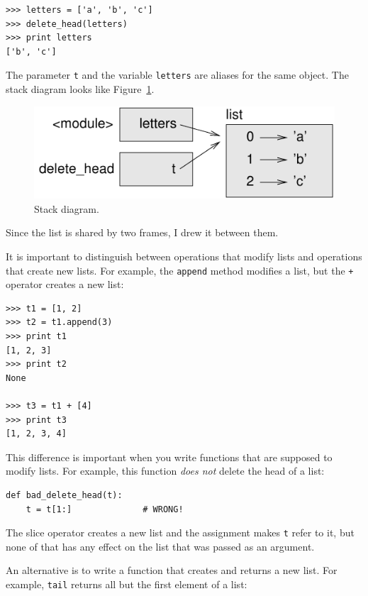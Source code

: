 \documentclass[10pt]{book}
\begin{document}
\begin{CJK}{UTF8}{gbsn}
\begin{verbatim}
>>> letters = ['a', 'b', 'c']
>>> delete_head(letters)
>>> print letters
['b', 'c']
\end{verbatim}
%
The parameter {\tt t} and the variable {\tt letters} are
aliases for the same object.  The stack diagram looks like
Figure~\ref{fig.stack5}.

\begin{figure}
\centerline
{\includegraphics[scale=0.8]{figs/stack5.pdf}}
\caption{Stack diagram.}
\label{fig.stack5}
\end{figure}


Since the list is shared by two frames, I drew
it between them.

It is important to distinguish between operations that
modify lists and operations that create new lists.  For
example, the {\tt append} method modifies a list, but the
{\tt +} operator creates a new list:

\begin{verbatim}
>>> t1 = [1, 2]
>>> t2 = t1.append(3)
>>> print t1
[1, 2, 3]
>>> print t2
None

>>> t3 = t1 + [4]
>>> print t3
[1, 2, 3, 4]
\end{verbatim}

This difference is important when you write functions that
are supposed to modify lists.  For example, this function
{\em does not} delete the head of a list:

\begin{verbatim}
def bad_delete_head(t):
    t = t[1:]              # WRONG!
\end{verbatim}

The slice operator creates a new list and the assignment
makes {\tt t} refer to it, but none of that has any effect
on the list that was passed as an argument.

An alternative is to write a function that creates and
returns a new list.  For
example, {\tt tail} returns all but the first
element of a list:


\end{CJK}
\end{document}

